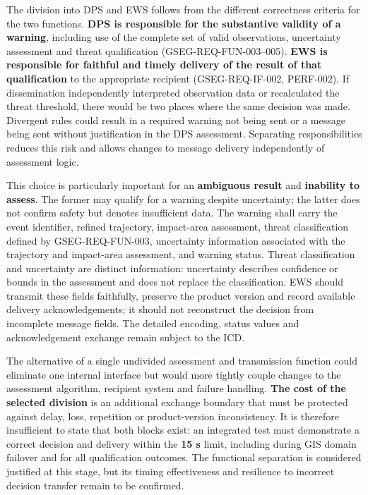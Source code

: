 The division into DPS and EWS follows from the different correctness criteria for the two functions. \textbf{DPS is responsible for the substantive validity of a warning}, including use of the complete set of valid observations, uncertainty assessment and threat qualification (GSEG-REQ-FUN-003–005). \textbf{EWS is responsible for faithful and timely delivery of the result of that qualification} to the appropriate recipient (GSEG-REQ-IF-002, PERF-002). If dissemination independently interpreted observation data or recalculated the threat threshold, there would be two places where the same decision was made. Divergent rules could result in a required warning not being sent or a message being sent without justification in the DPS assessment. Separating responsibilities reduces this risk and allows changes to message delivery independently of assessment logic.

This choice is particularly important for an \textbf{ambiguous result} and \textbf{inability to assess}. The former may qualify for a warning despite uncertainty; the latter does not confirm safety but denotes insufficient data. The warning shall carry the event identifier, refined trajectory, impact-area assessment, threat classification defined by GSEG-REQ-FUN-003, uncertainty information associated with the trajectory and impact-area assessment, and warning status. Threat classification and uncertainty are distinct information: uncertainty describes confidence or bounds in the assessment and does not replace the classification. EWS should transmit these fields faithfully, preserve the product version and record available delivery acknowledgements; it should not reconstruct the decision from incomplete message fields. The detailed encoding, status values and acknowledgement exchange remain subject to the ICD.

The alternative of a single undivided assessment and transmission function could eliminate one internal interface but would more tightly couple changes to the assessment algorithm, recipient system and failure handling. \textbf{The cost of the selected division} is an additional exchange boundary that must be protected against delay, loss, repetition or product-version inconsistency. It is therefore insufficient to state that both blocks exist: an integrated test must demonstrate a correct decision and delivery within the \textbf{15 s} limit, including during GIS domain failover and for all qualification outcomes. The functional separation is considered justified at this stage, but its timing effectiveness and resilience to incorrect decision transfer remain to be confirmed.

